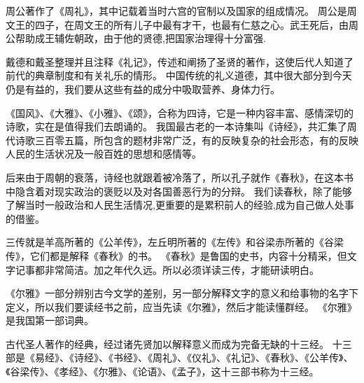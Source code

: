 \documentclass[avery5371,grid]{flashcards}
\begin{document}
{周公著作了《周礼》，其中记载着当时六宫的官制以及国家的组成情况。} %
{周公是周文王的四子，在周文王的所有儿子中最有才干，也最有仁慈之心。武王死后，由周公帮助成王辅佐朝政，由于他的贤德,把国家治理得十分富强.} %

{戴德和戴圣整理并且注释《礼记》，传述和阐扬了圣贤的著作，这使后代人知道了前代的典章制度和有关礼乐的情形。} %
{中国传统的礼义道德，其中很大部分到今天仍是有益的，我们要从这些有益的成分中吸取营养、身体力行。} %

{《国风》、《大雅》、《小雅》、《颂》，合称为四诗，它是一种内容丰富、感情深切的诗歌，实在是值得我们去朗诵的。} %
{我国最古老的一本诗集叫《诗经》，共汇集了周代诗歌三百零五篇，所包含的题材非常广泛，有的反映复杂的社会形态，有的反映人民的生活状况及一般百姓的思想和感情等。} %

{后来由于周朝的衰落，诗经也就跟着被冷落了，所以孔子就作《春秋》，在这本书中隐含着对现实政治的褒贬以及对各国善恶行为的分辩。} %
{我们读春秋，除了能够了解当时一般政治和人民生活情况,更重要的是累积前人的经验,成为自己做人处事的借鉴。} %

{三传就是羊高所著的《公羊传》，左丘明所著的《左传》和谷梁赤所著的《谷梁传》，它们都是解释《春秋》的书。} %
{《春秋》是鲁国的史书，内容十分精采，但文字记事都非常简洁。加之年代久远。所以必须详读三传，才能研读明白。} %



{《尔雅》一部分辨别古今文学的差别，另一部分解释文字的意义和给事物的名字下定义，所以我们要读经书之前，应当先读《尔雅》，然后才能读懂群经。} %
{《尔雅》是我国第一部词典。} %

{古代圣人著作的经典，经过诸先贤加以解释意义而成为完备无缺的十三经。} %
{十三部是《易经》、《诗经》、《书经》、《周礼》、《仪礼》、《礼记》、《春秋》、《公羊传》、《谷梁传》、《孝经》、《尔雅》、《论语》、《孟子》，这十三部书称为十三经。} %
\end{document}
